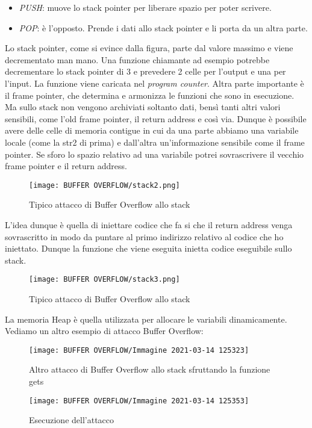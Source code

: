 \documentclass[14pt]{extreport}
\begin{document}
\begin{itemize}
    \item \textit{PUSH}: muove lo stack pointer per liberare spazio per poter scrivere.
    
    \item \textit{POP}: è l'opposto. Prende i dati allo stack pointer e li porta da un altra parte.
\end{itemize}
Lo stack pointer, come si evince dalla figura, parte dal valore massimo e viene decrementato man mano.
Una funzione chiamante ad esempio potrebbe decrementare lo stack pointer di 3 e prevedere 2 celle per l'output e una per l'input. La funzione viene caricata nel \textit{program counter}. Altra parte importante è il frame pointer, che determina e armonizza le funzioni che sono in esecuzione. Ma sullo stack non vengono archiviati soltanto dati, bensì tanti altri valori sensibili, come l'old frame pointer, il return address e così via. Dunque è possibile avere delle celle di memoria contigue in cui da una parte abbiamo una variabile locale (come la str2 di prima) e dall'altra un'informazione sensibile come il frame pointer. Se sforo lo spazio relativo ad una variabile potrei sovrascrivere il vecchio frame pointer e il return address.
\begin{figure}[H]
    \centering
    \texttt{[image: BUFFER OVERFLOW/stack2.png]}
    \caption{Tipico attacco di Buffer Overflow allo stack}
\end{figure}
L'idea dunque è quella di iniettare codice che fa si che il return address venga sovrascritto in modo da puntare al primo indirizzo relativo al codice che ho iniettato. Dunque la funzione che viene eseguita inietta codice eseguibile sullo stack.
\begin{figure}[H]
    \centering
    \texttt{[image: BUFFER OVERFLOW/stack3.png]}
    \caption{Tipico attacco di Buffer Overflow allo stack}
\end{figure}
La memoria Heap è quella utilizzata per allocare le variabili dinamicamente.\newline
Vediamo un altro esempio di attacco Buffer Overflow:

\begin{figure}[H]
    \centering
    \texttt{[image: BUFFER OVERFLOW/Immagine 2021-03-14 125323]}
    \caption{Altro attacco di Buffer Overflow allo stack sfruttando la funzione gets}
\end{figure}


\begin{figure}[H]
    \centering
    \texttt{[image: BUFFER OVERFLOW/Immagine 2021-03-14 125353]}
    \caption{Esecuzione dell'attacco}
\end{figure}
\end{document}
